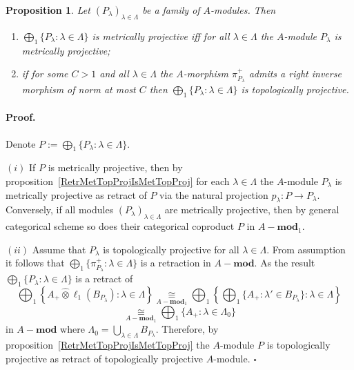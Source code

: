 \documentclass[12pt]{article}
\newcommand{\projtens}{\mathbin{\widehat{\otimes}}}
\newcommand{\isom}[1]{\mathop{\mathbin{\cong}}\limits_{#1}}
\newtheorem{proposition}[theorem]{Proposition}
\renewenvironment{proof}{\paragraph{Proof.}}{\hfill$\square$\medskip}
\begin{document}
\begin{proposition}\label{MetTopProjModCoprod} Let
    ${(P_\lambda)}_{\lambda\in\Lambda}$ be a family of $A$-modules. Then
    \begin{enumerate}[label = (\roman*)]
        \item $\bigoplus_1\{P_\lambda:\lambda\in\Lambda \}$ is metrically
              projective iff for all $\lambda\in\Lambda$ the $A$-module
              $P_\lambda$ is metrically projective;

        \item if for some $C>1$ and all $\lambda\in\Lambda$ the $A$-morphism
              $\pi_{P_\lambda}^+$ admits a right inverse morphism of norm at
              most $C$ then $\bigoplus_1\{P_\lambda:\lambda\in\Lambda \}$ is
              topologically projective.
    \end{enumerate}
\end{proposition}
\begin{proof} Denote $P:=\bigoplus_1\{P_\lambda:\lambda\in\Lambda \}$.

    $(i)$ If $P$ is metrically projective, then by
    proposition~\ref{RetrMetTopProjIsMetTopProj} for each $\lambda\in\Lambda$
    the $A$-module $P_\lambda$ is metrically projective as retract of $P$ via
    the natural projection $p_\lambda:P\to P_\lambda$. Conversely, if all
    modules ${(P_\lambda)}_{\lambda\in\Lambda}$ are metrically projective, then
    by general categorical scheme so does their categorical coproduct $P$ in
    $A-\mathbf{mod}_1$.

    $(ii)$ Assume that $P_\lambda$ is topologically projective for all
    $\lambda\in\Lambda$. From assumption it follows that
    $\bigoplus_1\{\pi_{P_\lambda}^+:\lambda\in\Lambda \}$ is a retraction in
    $A-\mathbf{mod}$. As the result $\bigoplus_1\{P_\lambda:\lambda\in\Lambda \}$ is a
    retract of
    $$
        \bigoplus\nolimits_1\left \{
        A_+\projtens \ell_1(B_{P_\lambda}):\lambda\in\Lambda
        \right \}
        \isom{A-\mathbf{mod}_1}
        \bigoplus\nolimits_1\left \{
        \bigoplus\nolimits_1\{A_+:\lambda'\in B_{P_\lambda}\}:
        \lambda\in\Lambda
        \right \}
    $$
    $$
        \isom{A-\mathbf{mod}_1}
        \bigoplus\nolimits_1\{A_+:\lambda\in\Lambda_0\}
    $$
    in $A-\mathbf{mod}$ where $\Lambda_0=\bigcup_{\lambda\in\Lambda}B_{P_\lambda}$.
    Therefore, by proposition~\ref{RetrMetTopProjIsMetTopProj} the $A$-module
    $P$ is topologically projective as retract of  topologically projective
    $A$-module.
\end{proof}
\end{document}
